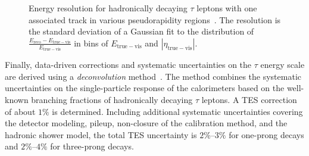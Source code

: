 \begin{figure}[htbp]
	\centering
	\caption[Energy resolution for hadronically decaying $\tau$ leptons with one associated track in various pseudorapidity regions. The resolution is the standard deviation of a Gaussian fit to the distribution of $\frac{E_{\mathrm{reco}}-E_{\mathrm{true-vis}}}{E_{\mathrm{true-vis}}}$ in bins of $E_{\mathrm{true-vis}}$ and $|\eta_{\mathrm{true-vis}}|$.]{Energy resolution for hadronically decaying $\tau$ leptons with one associated track in various pseudorapidity regions~\cite{TheATLASCollaboration:2015be}. The resolution is the standard deviation of a Gaussian fit to the distribution of $\frac{E_{\mathrm{reco}}-E_{\mathrm{true-vis}}}{E_{\mathrm{true-vis}}}$ in bins of $E_{\mathrm{true-vis}}$ and $|\eta_{\mathrm{true-vis}}|$.}
	\label{fig:reco-tau-energy-resolution}
\end{figure}


Finally, data-driven corrections and systematic uncertainties on the $\tau$ energy scale are derived using a \emph{deconvolution} method~\cite{TheATLASCollaboration:2011ks}. The method combines the systematic uncertainties on the single-particle response of the calorimeters based on the well-known branching fractions of hadronically decaying $\tau$ leptons. A TES correction of about $1\%$ is determined. Including additional systematic uncertainties covering the detector modeling, pileup, non-closure of the calibration method, and the hadronic shower model, the total TES uncertainty is $2\%$--$3\%$ for one-prong decays and $2\%$--$4\%$ for three-prong decays.

